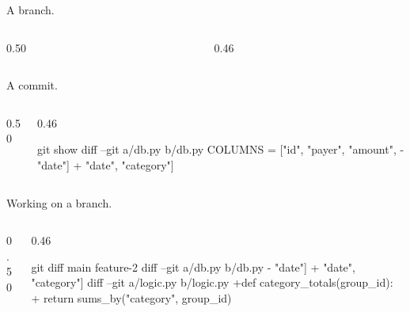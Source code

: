 \documentclass[aspectratio=169,10pt]{beamer}
\begin{document}
\begin{frame}{A branch.}
\vspace*{\fill}
\vskip5mm
\begin{columns}[t]
\begin{column}{0.50\textwidth}
\end{column}
\begin{column}{0.46\textwidth}
\end{column}
\end{columns}
\vfill
\end{frame}

\begin{frame}[fragile]{A commit.}
\vspace*{\fill}
\vskip5mm
\begin{columns}[t]
\begin{column}{0.50\textwidth}
\end{column}
\begin{column}{0.46\textwidth}
\begin{gitdiff}{git show}
diff --git a/db.py b/db.py
 COLUMNS = ["id", "payer", "amount",
-           "date"]
+           "date", "category"]
\end{gitdiff}
\end{column}
\end{columns}
\vfill
\end{frame}

\begin{frame}[fragile]{Working on a branch.}
\vspace*{\fill}
\vskip3mm
\begin{columns}[t]
\begin{column}{0.50\textwidth}
\end{column}
\begin{column}{0.46\textwidth}
\begin{gitdiff}{git diff main feature-2}
diff --git a/db.py b/db.py
-           "date"]
+           "date", "category"]
diff --git a/logic.py b/logic.py
+def category_totals(group_id):
+    return sums_by("category", group_id)
\end{gitdiff}
\end{column}
\end{columns}
\vfill
\end{frame}
\end{document}
